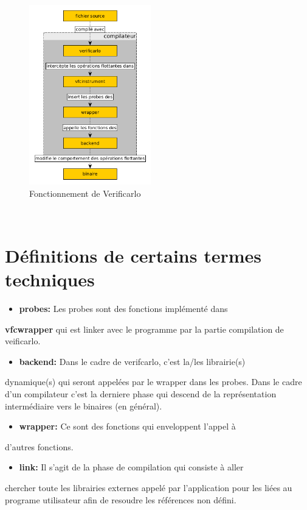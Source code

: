 \documentclass[11pt]{article}
\begin{document}
\begin{figure}[htbp]
\centering
\includegraphics[width=200px]{../ressources/verificarlo_works.png}
\caption{\label{fig:orgfd31292}Fonctionnement de Verificarlo}
\end{figure}\\
\vspace{5mm}
\section{Définitions de certains termes techniques}
\label{sec:org847d243}
\vspace{5mm}
\begin{itemize}
\item \textbf{probes:} Les probes sont des fonctions implémenté dans
\end{itemize}
\textbf{vfcwrapper} qui est linker avec le programme par la partie
compilation de veificarlo.

\begin{itemize}
\item \textbf{backend:} Dans le cadre de verifcarlo, c'est la/les librairie(s)
\end{itemize}
dynamique(s) qui seront appelées par le wrapper dans les
probes. Dans le cadre d'un compilateur c'est la derniere phase qui
descend de la représentation intermédiaire vers le binaires (en
général).

\begin{itemize}
\item \textbf{wrapper:} Ce sont des fonctions qui enveloppent l'appel à
\end{itemize}
d'autres fonctions.

\begin{itemize}
\item \textbf{link:} Il s'agit de la phase de compilation qui consiste à aller
\end{itemize}
chercher toute les librairies externes appelé par l'application
pour les liées au programe utilisateur afin de resoudre les
références non défini.
\end{document}
